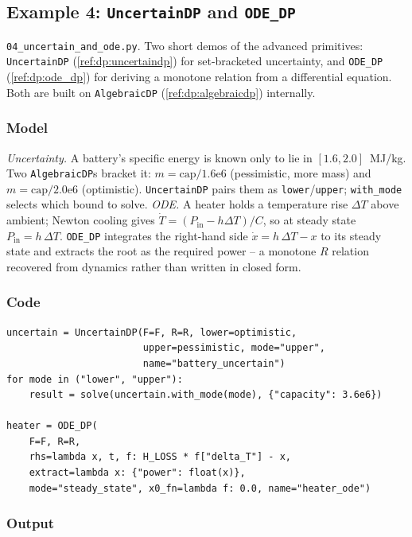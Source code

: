 \documentclass[11pt,a4paper]{article}
\begin{document}
\subsection{Example 4: \texttt{UncertainDP} and \texttt{ODE\_DP}}\label{ex:04}

\texttt{04\_uncertain\_and\_ode.py}. Two short demos of the advanced
primitives: \texttt{UncertainDP} (\ref{ref:dp:uncertaindp}) for
set-bracketed uncertainty, and \texttt{ODE\_DP} (\ref{ref:dp:ode_dp}) for
deriving a monotone relation from a differential equation. Both are built
on \texttt{AlgebraicDP} (\ref{ref:dp:algebraicdp}) internally.

\subsubsection*{Model}

\emph{Uncertainty.} A battery's specific energy is known only to lie in
$[1.6,2.0]$~MJ/kg. Two \texttt{AlgebraicDP}s bracket it:
$m=\text{cap}/1.6\text{e}6$ (pessimistic, more mass) and
$m=\text{cap}/2.0\text{e}6$ (optimistic). \texttt{UncertainDP} pairs them
as \texttt{lower}/\texttt{upper}; \texttt{with\_mode} selects which bound
to solve. \emph{ODE.} A heater holds a temperature rise $\Delta T$ above
ambient; Newton cooling gives $\dot T=(P_{\text{in}}-h\Delta T)/C$, so at
steady state $P_{\text{in}}=h\,\Delta T$. \texttt{ODE\_DP} integrates the
right-hand side $\dot x = h\,\Delta T - x$ to its steady state and
extracts the root as the required power -- a monotone $R$ relation
recovered from dynamics rather than written in closed form.

\subsubsection*{Code}

\begin{lstlisting}
uncertain = UncertainDP(F=F, R=R, lower=optimistic,
                        upper=pessimistic, mode="upper",
                        name="battery_uncertain")
for mode in ("lower", "upper"):
    result = solve(uncertain.with_mode(mode), {"capacity": 3.6e6})

heater = ODE_DP(
    F=F, R=R,
    rhs=lambda x, t, f: H_LOSS * f["delta_T"] - x,
    extract=lambda x: {"power": float(x)},
    mode="steady_state", x0_fn=lambda f: 0.0, name="heater_ode")
\end{lstlisting}

\subsubsection*{Output}
\end{document}
